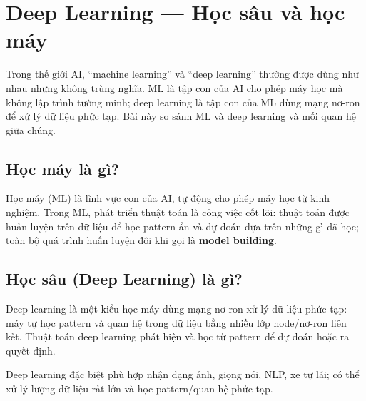 \section{Deep Learning --- Học sâu và học máy}

\begin{dongco}[title={Hai thuật ngữ hay bị dùng lẫn}]
Trong thế giới AI, ``machine learning'' và ``deep learning'' thường được dùng như nhau nhưng không trùng nghĩa.
ML là tập con của AI cho phép máy học mà không lập trình tường minh; deep learning là tập con của ML dùng mạng nơ-ron để xử lý dữ liệu phức tạp.
Bài này so sánh ML và deep learning và mối quan hệ giữa chúng.
\end{dongco}

\begin{vidu}[title={Hình minh hoạ deep learning}]
\end{vidu}

\subsection{Học máy là gì?}

\begin{dinhnghia}[title={Machine Learning (ML)}]
Học máy (ML) là lĩnh vực con của AI, tự động cho phép máy học từ kinh nghiệm.
Trong ML, phát triển thuật toán là công việc cốt lõi: thuật toán được huấn luyện trên dữ liệu để học pattern ẩn và dự đoán dựa trên những gì đã học; toàn bộ quá trình huấn luyện đôi khi gọi là \textbf{model building}.
\end{dinhnghia}

\subsection{Học sâu (Deep Learning) là gì?}

\begin{dinhnghia}[title={Deep Learning}]
Deep learning là một kiểu học máy dùng mạng nơ-ron xử lý dữ liệu phức tạp: máy tự học pattern và quan hệ trong dữ liệu bằng nhiều lớp node/nơ-ron liên kết.
Thuật toán deep learning phát hiện và học từ pattern để dự đoán hoặc ra quyết định.
\end{dinhnghia}

\begin{ynghia}[title={Phù hợp với dữ liệu phức tạp}]
Deep learning đặc biệt phù hợp nhận dạng ảnh, giọng nói, NLP, xe tự lái; có thể xử lý lượng dữ liệu rất lớn và học pattern/quan hệ phức tạp.
\end{ynghia}

